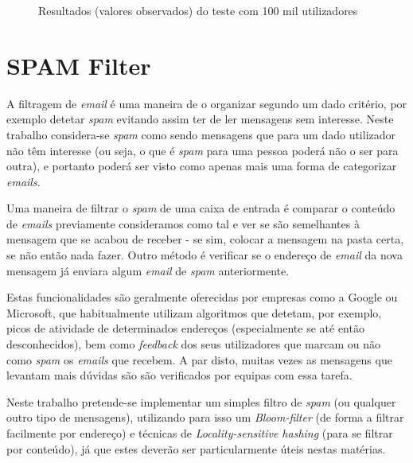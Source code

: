 \documentclass[a4paper,11pt,openright,oneside]{report}
\begin{document}
\begin{figure}[ht]
\center
{}
\caption{Resultados (valores observados) do teste com 100 mil utilizadores}
\label{fig:test100ko}
\end{figure}


\chapter{SPAM Filter}
\label{chap.spamfilter}

A filtragem de \textit{email} é uma maneira de o organizar segundo um dado critério, por exemplo detetar \textit{spam} evitando assim ter de ler mensagens sem interesse. Neste trabalho considera-se \textit{spam} como sendo mensagens que para um dado utilizador não têm interesse (ou seja, o que é \textit{spam} para uma pessoa poderá não o ser para outra), e portanto poderá ser visto como apenas mais uma forma de categorizar \textit{emails}.

Uma maneira de filtrar o \textit{spam} de uma caixa de entrada é comparar o conteúdo de \textit{emails} previamente consideramos como tal e ver se são semelhantes à mensagem que se acabou de receber - se sim, colocar a mensagem na pasta certa, se não então nada fazer. Outro método é verificar se o endereço de \textit{email} da nova mensagem já enviara algum \textit{email} de \textit{spam} anteriormente.

Estas funcionalidades são geralmente oferecidas por empresas como a Google ou Microsoft, que habitualmente utilizam algoritmos que detetam, por exemplo, picos de atividade de determinados endereços (especialmente se até então desconhecidos), bem como \textit{feedback} dos seus utilizadores que marcam ou não como \textit{spam} os \textit{emails} que recebem. A par disto, muitas vezes as mensagens que levantam mais dúvidas são são verificados por equipas com essa tarefa.

Neste trabalho pretende-se implementar um simples filtro de \textit{spam} (ou qualquer outro tipo de mensagens), utilizando para isso um \textit{Bloom-filter} (de forma a filtrar facilmente por endereço) e técnicas de \textit{Locality-sensitive hashing} (para se filtrar por conteúdo), já que estes deverão ser particularmente úteis nestas matérias.
\end{document}
